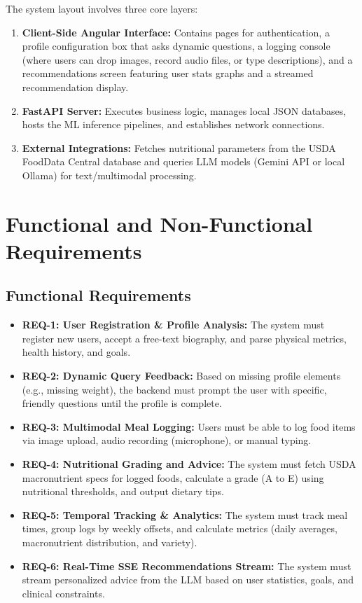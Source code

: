 \documentclass[12pt,a4paper,oneside]{report}
\begin{document}
The system layout involves three core layers:
\begin{enumerate}
    \item \textbf{Client-Side Angular Interface:} Contains pages for authentication, a profile configuration box that asks dynamic questions, a logging console (where users can drop images, record audio files, or type descriptions), and a recommendations screen featuring user stats graphs and a streamed recommendation display.
    \item \textbf{FastAPI Server:} Executes business logic, manages local JSON databases, hosts the ML inference pipelines, and establishes network connections.
    \item \textbf{External Integrations:} Fetches nutritional parameters from the USDA FoodData Central database and queries LLM models (Gemini API or local Ollama) for text/multimodal processing.
\end{enumerate}

\section{Functional and Non-Functional Requirements}

\subsection{Functional Requirements}
\begin{itemize}
    \item \textbf{REQ-1: User Registration \& Profile Analysis:} The system must register new users, accept a free-text biography, and parse physical metrics, health history, and goals.
    \item \textbf{REQ-2: Dynamic Query Feedback:} Based on missing profile elements (e.g., missing weight), the backend must prompt the user with specific, friendly questions until the profile is complete.
    \item \textbf{REQ-3: Multimodal Meal Logging:} Users must be able to log food items via image upload, audio recording (microphone), or manual typing.
    \item \textbf{REQ-4: Nutritional Grading and Advice:} The system must fetch USDA macronutrient specs for logged foods, calculate a grade (A to E) using nutritional thresholds, and output dietary tips.
    \item \textbf{REQ-5: Temporal Tracking \& Analytics:} The system must track meal times, group logs by weekly offsets, and calculate metrics (daily averages, macronutrient distribution, and variety).
    \item \textbf{REQ-6: Real-Time SSE Recommendations Stream:} The system must stream personalized advice from the LLM based on user statistics, goals, and clinical constraints.
\end{itemize}
\end{document}
